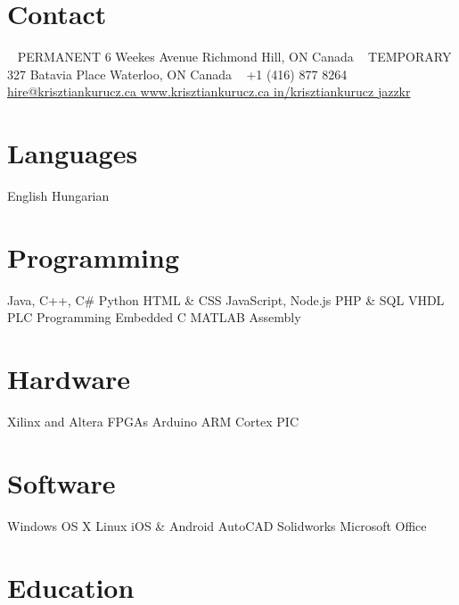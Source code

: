 \documentclass[hidelinks]{kkurucz-cv}
\begin{document}


\begin{aside} %
\section{Contact}
~
{\headingfont PERMANENT}
6 Weekes Avenue
Richmond Hill, ON
Canada
~
{\headingfont TEMPORARY}
327 Batavia Place
Waterloo, ON
Canada
~
{+1 (416) 877 8264\hspace{1.5mm}\mobile}
~
\href{mailto:hire@krisztiankurucz.ca}{hire@krisztiankurucz.ca }\mail
\href{http://www.krisztiankurucz.ca}{www.krisztiankurucz.ca }\website
\href{http://ca.linkedin.com/in/krisztiankurucz}{in/krisztiankurucz }\linkedin
\href{http://www.github.com/jazzkr}{jazzkr }\github
\section{Languages}
English
Hungarian
\section{Programming}
Java, C++, C\#
Python
HTML \& CSS
JavaScript, Node.js
PHP \& SQL
VHDL
PLC Programming
Embedded C
MATLAB
Assembly
\section{Hardware}
Xilinx and Altera FPGAs
Arduino
ARM Cortex
PIC
\section{Software}
Windows
OS X
Linux
iOS \& Android
AutoCAD
Solidworks
Microsoft Office
\end{aside}


\section{Education}
\end{document}
